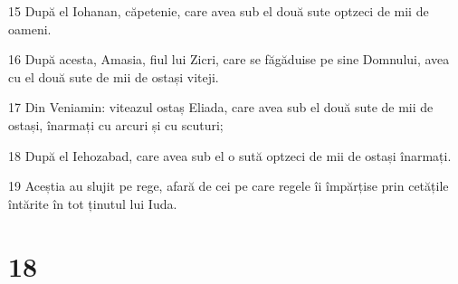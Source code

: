 \par 15 După el Iohanan, căpetenie, care avea sub el două sute optzeci de mii de oameni.
\par 16 După acesta, Amasia, fiul lui Zicri, care se făgăduise pe sine Domnului, avea cu el două sute de mii de ostași viteji.
\par 17 Din Veniamin: viteazul ostaș Eliada, care avea sub el două sute de mii de ostași, înarmați cu arcuri și cu scuturi;
\par 18 După el Iehozabad, care avea sub el o sută optzeci de mii de ostași înarmați.
\par 19 Aceștia au slujit pe rege, afară de cei pe care regele îi împărțise prin cetățile întărite în tot ținutul lui Iuda.

\chapter{18}


